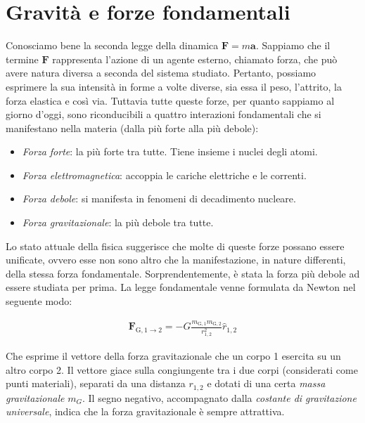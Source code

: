 \marginpar{\minitoc}

\section{Gravità e forze fondamentali}
Conosciamo bene la seconda legge della dinamica $\mathbf{F} = m\mathbf{a}$.
Sappiamo che il termine $\mathbf{F}$ rappresenta l'azione di un agente esterno,
chiamato forza, che può avere natura diversa a seconda del sistema studiato.
Pertanto, possiamo esprimere
la sua intensità in forme a volte diverse, sia essa il peso, l'attrito, la
forza elastica e così via. Tuttavia tutte queste forze, per quanto sappiamo al
giorno d'oggi, sono riconducibili a quattro interazioni fondamentali che si
manifestano nella materia (dalla più forte alla più debole):
\begin{itemize}
    \item \textit{Forza forte}: la più forte tra tutte. Tiene insieme i nuclei
    degli atomi.

    \item \textit{Forza elettromagnetica}: accoppia le cariche elettriche e
    le correnti.

    \item \textit{Forza debole}: si manifesta in fenomeni di decadimento nucleare.
    
    \item \textit{Forza gravitazionale}: la più debole tra tutte.
\end{itemize}
Lo stato attuale della fisica suggerisce che molte di queste forze possano essere
unificate, ovvero esse non sono altro che la manifestazione, in nature differenti,
della stessa forza fondamentale.
Sorprendentemente, è stata la forza più debole ad essere studiata per prima.
La legge fondamentale venne formulata da Newton nel seguente modo:

\begin{align}
    \mathbf{F}_{\text{G}, 1\to 2} = -G\frac{m_{\text{G},1}m_{\text{G},2}}{r^2_{1,2}}\hat{r}_{1,2}\label{gravity}
\end{align}

\noindent Che esprime il vettore della forza gravitazionale che un corpo 1 esercita su un
altro corpo 2. Il vettore giace sulla congiungente tra i due corpi (considerati come
punti materiali), separati da una distanza $r_{1,2}$ e dotati di una certa
\textit{massa gravitazionale} $m_G$. Il segno negativo, accompagnato dalla
\textit{costante di gravitazione universale}, indica che la forza gravitazionale è
sempre attrattiva.

